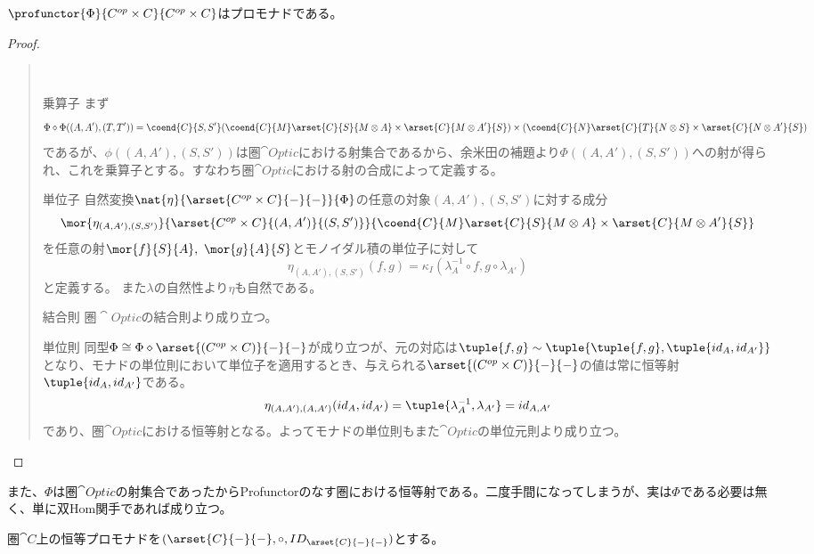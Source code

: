 \documentclass[uplatex,dvipdfmx]{jsarticle}
\begin{document}
  \begin{prop}
    $\profunctor{\Phi}{C^{op}\times C}{C^{op}\times C}$はプロモナドである。
  \end{prop}

  \begin{proof}
    \begin{quote}~
      \begin{mydescription}
        \item[乗算子]まず\[\Phi\diamond\Phi((A,A'),(T,T')) = \coend{C}{S,S'}(\coend{C}{M}\arset{C}{S}{M\otimes A}\times \arset{C}{M\otimes A'}{S})\times(\coend{C}{N}\arset{C}{T}{N\otimes S}\times \arset{C}{N\otimes A'}{S})\]であるが、$\phi((A,A'),(S,S'))$は圏$\cat{Optic}$における射集合であるから、余米田の補題より$\Phi((A,A'),(S,S'))$への射が得られ、これを乗算子とする。すなわち圏$\cat{Optic}$における射の合成によって定義する。
        \item[単位子] 
        自然変換$\nat{\eta}{\arset{C^{op}\times C}{-}{-}}{\Phi}$の任意の対象$(A,A'),(S,S')$に対する成分\[\mor{\eta_{(A,A'),(S,S')}}{\arset{C^{op}\times C}{(A,A')}{(S,S')}}{\coend{C}{M}\arset{C}{S}{M\otimes A}\times \arset{C}{M\otimes A'}{S}}\]を任意の射$\mor{f}{S}{A},\ \mor{g}{A}{S}$とモノイダル積の単位子に対して\[\eta_{(A,A'),(S,S')}(f,g) = \kappa_I(\lambda_A^{-1}\circ f,g\circ\lambda_{A'})\]と定義する。
        また$\lambda$の自然性より$\eta$も自然である。
        \item[結合則] $圏\cat{Optic}$の結合則より成り立つ。
        \item[単位則] 同型$\Phi\cong\Phi\diamond\arset{(C^{op}\times C)}{-}{-}$が成り立つが、元の対応は$\tuple{f,g}\sim\tuple{\tuple{f,g},\tuple{id_A,id_{A'}}}$となり、モナドの単位則において単位子を適用するとき、与えられる$\arset{(C^{op}\times C)}{-}{-}$の値は常に恒等射$\tuple{id_A,id_{A'}}$である。\[\eta_{(A,A'),(A,A')}(id_A,id_{A'})=\tuple{\lambda_A^{-1},\lambda_{A'}}=id_{A,A'}\]であり、圏$\cat{Optic}$における恒等射となる。よってモナドの単位則もまた$\cat{Optic}$の単位元則より成り立つ。
      \end{mydescription}
    \end{quote}
  \end{proof}
  また、$\Phi$は圏$\cat{Optic}$の射集合であったからProfunctorのなす圏における恒等射である。二度手間になってしまうが、実は$\Phi$である必要は無く、単に双Hom関手であれば成り立つ。
  \begin{define}[恒等プロモナド]
    圏$\cat{C}$上の恒等プロモナドを$(\arset{C}{-}{-},\circ,ID_{\arset{C}{-}{-}})$とする。
  \end{define}
\end{document}

